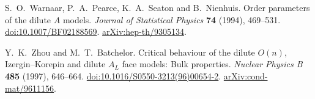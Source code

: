 S.~O.~Warnaar, P.~A.~Pearce, K.~A.~Seaton and B.~Nienhuis.
Order parameters of the dilute $A$ models.
\emph{Journal of Statistical Physics} \textbf{74} (1994), 469--531.
\href{https://doi.org/10.1007/BF02188569}{doi:10.1007/BF02188569}.
\href{https://arxiv.org/abs/hep-th/9305134}{arXiv:hep-th/9305134}.

Y.~K.~Zhou and M.~T.~Batchelor.
Critical behaviour of the dilute $O(n)$, Izergin--Korepin and dilute
$A_L$ face models: Bulk properties.
\emph{Nuclear Physics B} \textbf{485} (1997), 646--664.
\href{https://doi.org/10.1016/S0550-3213(96)00654-2}{doi:10.1016/S0550-3213(96)00654-2}.
\href{https://arxiv.org/abs/cond-mat/9611156}{arXiv:cond-mat/9611156}.

